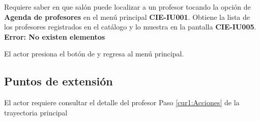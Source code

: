  \begin{UCtrayectoria}
    \UCpaso[\UCactor] Requiere saber en que salón puede localizar a un profesor tocando la opción de \textbf{Agenda de profesores} en el menú principal \textbf{CIE-IU001}.
    \UCpaso[\UCsist] Obtiene la lista de los profesores registrados en el catálogo y lo muestra en la pantalla \textbf{CIE-IU005}. \textbf{Error: No existen elementos}

	\UCpaso[\UCactor] El actor presiona el botón de  y regresa al menú principal.
 \end{UCtrayectoria}

%   
%    
%   
% 
% 	
% 	

 
\subsection{Puntos de extensión}

\UCExtensionPoint
{El actor requiere consultar el detalle del profesor  }
{ Paso \ref{cur1:Acciones} de la trayectoria principal}
{}

 